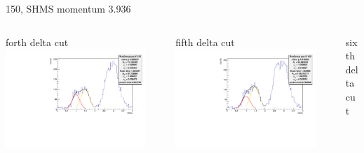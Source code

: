 \documentclass[aspectratio=169,xcolor=dvipsnames]{beamer}
\begin{document}
\begin{frame}{150, SHMS momentum 3.936}
\begin{columns}
\begin{column}[T]{0.33\textwidth}
\end{column}
\end{columns}
\begin{columns}
\begin{column}[T]{0.33\textwidth}
forth delta cut \\
\includegraphics[width = 0.9\textwidth]{results/pid/rftime/rftime_pos_150_3.pdf}
\end{column}
\begin{column}[T]{0.33\textwidth}
fifth delta cut \\
\includegraphics[width = 0.9\textwidth]{results/pid/rftime/rftime_pos_150_4.pdf}
\end{column}
\begin{column}[T]{0.33\textwidth}
sixth delta cut \\

\end{column}
\end{columns}
\end{frame}
\end{document}
